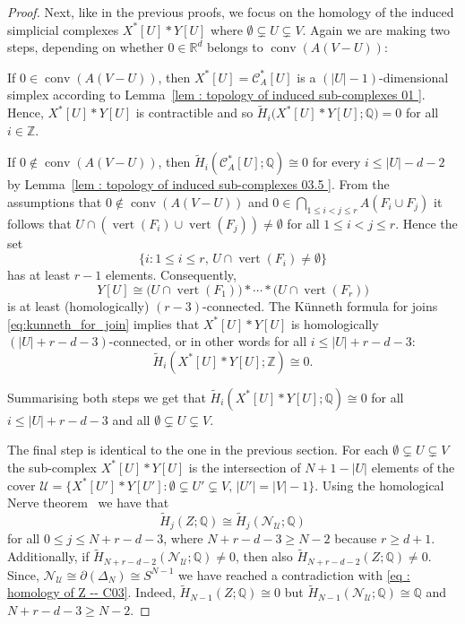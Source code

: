 \documentclass[a4paper,11pt,reqno, english]{amsart}
\theoremstyle{definition}
\theoremstyle{remark}
\newcommand\R{\mathbb R}
\newcommand\Z{\mathbb Z}
\newcommand\Q{\mathbb Q}
\newcommand\NN{\mathscr N}
\newcommand\U{\mathscr U}
\newcommand\CC{\mathscr C}
\DeclareMathOperator{\vertex}{\mathrm{vert}}
\DeclareMathOperator{\conv}{\mathrm{conv}}
\begin{document}
\begin{proof}
	\medskip
	Next, like in the previous proofs, we focus on the homology of the induced simplicial complexes $X^*[U]*Y[U]$ where $\emptyset \subsetneq  U \subsetneq  V$.
	Again we are making two steps, depending on whether $0\in\R^d$ belongs to $\conv(A(V-U))$:
	\begin{compactenum}[\quad\rm (1)]
		\item If $0\in\conv(A(V-U))$, then $X^*[U]=\CC_A^*[U]$ is a $(|U|-1)$-dimensional simplex according to Lemma~\ref{lem : topology of induced sub-complexes 01 }. Hence, $X^*[U]*Y[U]$ is contractible and so $\widetilde{H}_{i}\big(X^*[U]*Y[U];\Q\big)=0$ for all $i\in\Z$.
		\item If $0\notin\conv(A(V-U))$, then $\widetilde{H}_i(\CC_A^*[U];\Q)\cong 0$ for every  $i\leq |U|-d-2$  by Lemma~\ref{lem : topology of induced sub-complexes 03.5 }. From the assumptions that $0\notin\conv(A(V-U))$ and $0\in \bigcap_{1\leq i<j\leq r} A(F_i\cup F_j)$ it follows that $U \cap ( \vertex(F_i)\cup \vertex(F_j))   \neq\emptyset$ for all $1\leq i<j\leq r$.
		Hence the set \[\{i : 1\leq i\leq r,\, U \cap\vertex(F_i)\neq\emptyset \}\] has at least $r-1$ elements.
		Consequently,
		\[
			Y[U]\cong \big( U\cap \vertex({F_1})\big) *\cdots *\big( U\cap \vertex ({F_{r}})\big)
		\]
		is at least (homologically) $(r-3)$-connected.
		The K\"unneth formula for joins \eqref{eq:kunneth_for_join} implies that $X^*[U]*Y[U]$ is homologically $(|U|+r-d-3)$-connected, or in other words for all $i\leq |U|+r-d-3$:
		\[
			\widetilde{H}_i(X^*[U]*Y[U];\Z)\cong 0.
		\]
	\end{compactenum}
	Summarising both steps we get that  $\widetilde{H}_i(X^*[U]*Y[U];\Q)\cong 0$ for all $i\leq |U|+r-d-3$ and all $\emptyset \subsetneq  U \subsetneq  V$.

	\medskip
	The final step is identical to the one in the previous section.
	For each  $\emptyset \subsetneq  U \subsetneq  V$ the sub-complex $X^*[U]*Y[U]$ is the intersection of $N+1-|U|$ elements of the cover $\U=\{X^*[U']*Y[U'] : \emptyset\subsetneq U' \subsetneq V,\, |U'|=|V|-1\}$.
	Using the homological Nerve theorem~\cite[Thm.\,2.1]{Meshulam2001} we have that
	\[
		\widetilde{H}_{j}(Z;\Q)\cong \widetilde{H}_{j}(\NN_{\U};\Q)
	\]
	for all $0\leq j\leq N+r-d-3$, where $N+r-d-3\geq N-2$ because $r\geq d+1$.
	Additionally, if $\widetilde{H}_{N+r-d-2}(\NN_{\U};\Q)\neq 0$, then also $\widetilde{H}_{N+r-d-2}(Z;\Q)\neq 0$.
	Since, $\NN_{\U}\cong\partial ( \Delta_{N})\cong S^{N-1}$ we have reached a contradiction with \eqref{eq : homology of Z -- C03}.
	Indeed, $\widetilde{H}_{N-1}(Z;\Q)\cong 0$ but $\widetilde{H}_{N-1}(\NN_{\U};\Q)\cong \Q$ and $N+r-d-3\geq N-2$.



\end{proof}
\end{document}
